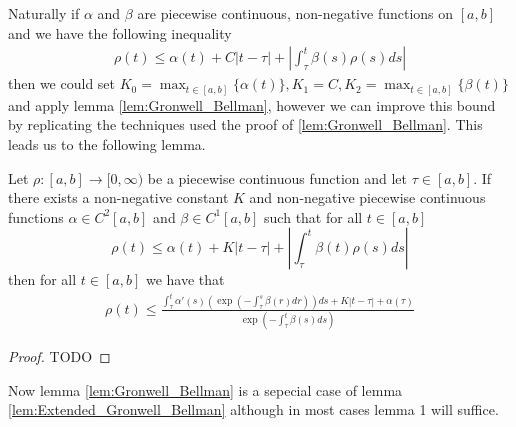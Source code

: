 \documentclass{unswmaths}
\begin{document}
Naturally if $ \alpha $ and $  \beta $ are piecewise continuous, non-negative functions on
$ [a, b] $ and we have the following inequality
\begin{align*}
	\rho(t) \leq \alpha(t) + C|t - \tau| + | \int_\tau^t \beta(s)\rho(s) ds|
\end{align*}
then we could set $ K_0 = \max_{t \in [a,b]}\{\alpha(t)\}, K_1 = C, K_2 = \max_{t \in [a,b]}\{\beta(t)\} $
and apply lemma \ref{lem:Gronwell_Bellman}, however we can improve this bound by replicating the
techniques used the proof of \ref{lem:Gronwell_Bellman}. This leads us to the following lemma.
\begin{unswlem}
\label{lem:Extended_Gronwell_Bellman}
Let $ \rho : [a,b] \longrightarrow [0, \infty) $ be a piecewise continuous function
and let $ \tau \in [a,b] $. If there exists a non-negative constant
$ K $ and non-negative piecewise continuous functions $ \alpha \in C^2[a,b] $ and $ \beta \in C^1[a,b] $
such that for all $ t \in [a,b] $
$$ \rho(t) \leq \alpha(t) + K|t-\tau| + |\int_\tau^t \beta(t) \rho(s) ds | $$
then for all $ t \in [a,b] $ we have that
\begin{align*}
    \rho(t) \leq \frac{\int_\tau^t \alpha'(s)\left( \exp(- \int_\tau^s \beta(r)dr) \right)ds + K|t - \tau| + \alpha(\tau) }{\exp(-\int_\tau^t\beta(s)ds)} 
\end{align*}
\end{unswlem}
\begin{proof}
TODO
\end{proof}
Now lemma \ref{lem:Gronwell_Bellman} is a sepecial case of lemma \ref{lem:Extended_Gronwell_Bellman}
although in most cases lemma 1 will suffice.
\end{document}

